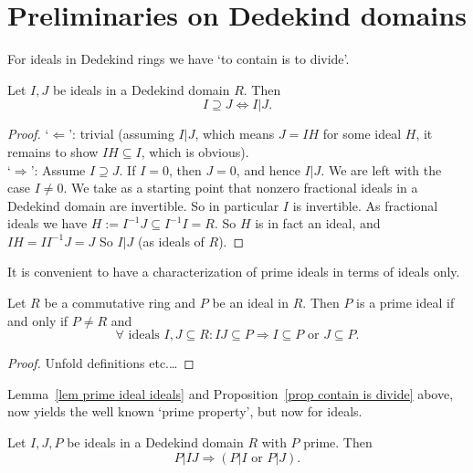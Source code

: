 \documentclass{amsart}
\begin{document}
\section{Preliminaries on Dedekind domains}

For ideals in Dedekind rings we have \lq to contain is to divide\rq. 
\begin{proposition}\label{prop contain is divide}
Let $I,J$ be ideals in a Dedekind domain $R$. Then
\begin{equation}\label{eqn contain is divide}
I \supseteq J \Leftrightarrow I|J.
\end{equation}
\end{proposition}

\begin{proof}
\lq $\Leftarrow$\rq: trivial (assuming $I|J$, which means $J=IH$ for some ideal $H$, it remains to show $IH \subseteq I$, which is obvious).\\
\lq $\Rightarrow$\rq: Assume $I \supseteq J$. If $I=0$, then $J=0$, and hence $I|J$. We are left with the case $I\not=0$.
We take as a starting point that nonzero fractional ideals in a Dedekind domain are invertible. So in particular $I$ is invertible. As fractional ideals we have $H:=I^{-1} J \subseteq I^{-1} I=R$. So $H$ is in fact an ideal, and $I H=I I^{-1} J=J$ So $I|J$ (as ideals of $R$).
\end{proof}

It is convenient to have a characterization of prime ideals in terms of ideals only.

\begin{lemma}\label{lem prime ideal ideals}
Let $R$ be a commutative ring and $P$ be an ideal in $R$. Then $P$ is a prime ideal if and only if $P\not=R$ and
\begin{equation}\label{eqn prime ideal ideals}
\forall \text{ ideals } I,J \subseteq R: IJ \subseteq P \Rightarrow I \subseteq P \text{ or } J \subseteq P.
\end{equation}
\end{lemma}

\begin{proof}
Unfold definitions etc.\ldots
\end{proof}

Lemma~\ref{lem prime ideal ideals} and Proposition~\ref{prop contain is divide} above, now yields the well known \lq prime property\rq, but now for ideals.

\begin{corollary}\label{cor prime property ideal}
Let $I,J,P$ be ideals in a Dedekind domain $R$ with $P$ prime. Then
\[ P|IJ \Rightarrow \left (P|I \text{ or } P|J \right).\]
\end{corollary}
\end{document}
